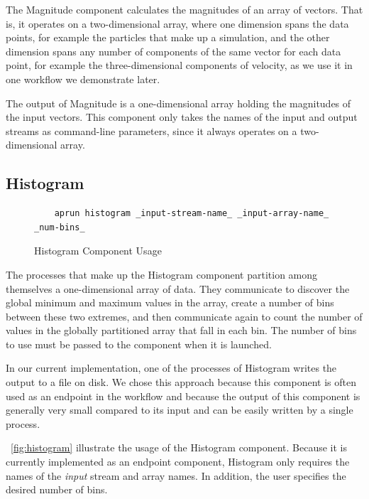 The Magnitude component calculates the magnitudes
of an array of vectors. That is, it operates
on a two-dimensional array, where one dimension spans
the data points, for example the particles that
make up a simulation, and the other dimension spans any number
of components of the same vector for each data point, for example
the three-dimensional components of velocity,
as we use it in one workflow we demonstrate later.

The output of Magnitude is a one-dimensional array holding
the magnitudes of the input vectors. This \sys component
only takes the names of the input and output streams
as command-line parameters, since it always
operates on a two-dimensional array.

\subsection{Histogram}

\begin{figure}
  \begin{lstlisting}
    aprun histogram _input-stream-name_ _input-array-name_ _num-bins_
  \end{lstlisting}
  \vspace{-0.10in}
  \caption{Histogram Component Usage}
  \label{fig:histogram}
  \vspace{-0.15in}
\end{figure}

The processes that make up the Histogram component
partition among themselves a one-dimensional
array of data. They communicate to discover the global
minimum and maximum values in the array, create a
number of bins between these two extremes, and
then communicate again to count the number of values in the
globally partitioned array that fall in each bin.
The number of bins to use must be passed to the
component when it is launched.

In our current implementation, one of the processes
of Histogram writes the
output to a file on disk. We chose this approach
because this component is often used as an
endpoint in the workflow and because the output of this
component is generally very small compared to its input
and can be easily written by a single process.

~\autoref{fig:histogram} illustrate the usage of
the Histogram component. Because it is currently
implemented as an endpoint component, Histogram
only requires the names of the \textit{input}
stream and array names. In addition, the user
specifies the desired number of bins.

